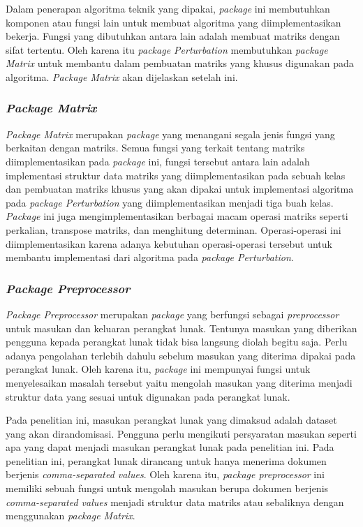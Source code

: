 Dalam penerapan algoritma teknik yang dipakai, \textit{package} ini membutuhkan komponen atau fungsi lain untuk membuat algoritma yang diimplementasikan bekerja. Fungsi yang dibutuhkan antara lain adalah membuat matriks dengan sifat tertentu. Oleh karena itu \textit{package Perturbation} membutuhkan \textit{package Matrix} untuk membantu dalam pembuatan matriks yang khusus digunakan pada algoritma. \textit{Package Matrix} akan dijelaskan setelah ini.

\subsubsection{\textit{Package Matrix}}
\label{subsubsec:package-matrix}

\textit{Package Matrix} merupakan \textit{package} yang menangani segala jenis fungsi yang berkaitan dengan matriks. Semua fungsi yang terkait tentang matriks diimplementasikan pada \textit{package} ini, fungsi tersebut antara lain adalah implementasi struktur data matriks yang diimplementasikan pada sebuah kelas dan pembuatan matriks khusus yang akan dipakai untuk implementasi algoritma pada \textit{package Perturbation} yang diimplementasikan menjadi tiga buah kelas. \textit{Package} ini juga mengimplementasikan berbagai macam operasi matriks seperti perkalian, transpose matriks, dan menghitung determinan. Operasi-operasi ini diimplementasikan karena adanya kebutuhan operasi-operasi tersebut untuk membantu implementasi dari algoritma pada \textit{package Perturbation}.

\subsubsection{\textit{Package Preprocessor}}
\label{subsubsec:package-preprocessor}

\textit{Package Preprocessor} merupakan \textit{package} yang berfungsi sebagai \textit{preprocessor} untuk masukan dan keluaran perangkat lunak. Tentunya masukan yang diberikan pengguna kepada perangkat lunak tidak bisa langsung diolah begitu saja. Perlu adanya pengolahan terlebih dahulu sebelum masukan yang diterima dipakai pada perangkat lunak. Oleh karena itu, \textit{package} ini mempunyai fungsi untuk menyelesaikan masalah tersebut yaitu mengolah masukan yang diterima menjadi struktur data yang sesuai untuk digunakan pada perangkat lunak.

Pada penelitian ini, masukan perangkat lunak yang dimaksud adalah dataset yang akan dirandomisasi. Pengguna perlu mengikuti persyaratan masukan seperti apa yang dapat menjadi masukan perangkat lunak pada penelitian ini. Pada penelitian ini, perangkat lunak dirancang untuk hanya menerima dokumen berjenis \textit{comma-separated values}. Oleh karena itu, \textit{package preprocessor} ini memiliki sebuah fungsi untuk mengolah masukan berupa dokumen berjenis \textit{comma-separated values} menjadi struktur data matriks atau sebaliknya dengan menggunakan \textit{package Matrix}.

